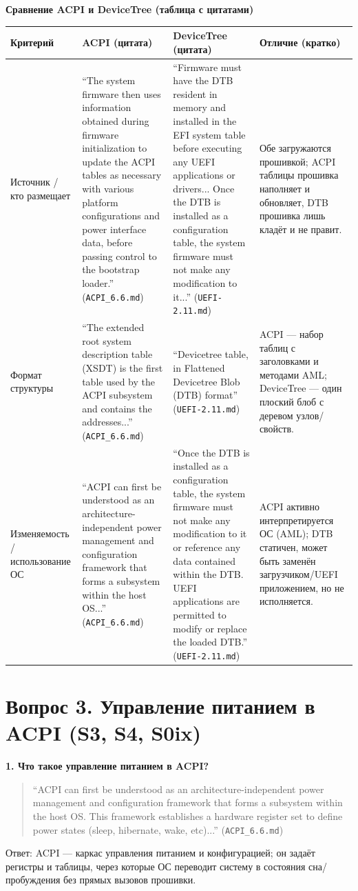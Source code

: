\documentclass[a4paper,12pt]{article}
\begin{document}
\noindent\textbf{Сравнение ACPI и DeviceTree (таблица с цитатами)}\\[4pt]
\begin{tabular}{|p{2.6cm}|p{4.6cm}|p{4.6cm}|p{3cm}|}
\hline
Критерий & ACPI (цитата) & DeviceTree (цитата) & Отличие (кратко) \\
\hline
Источник / кто размещает & ``The system firmware then uses information obtained during firmware initialization to update the ACPI tables as necessary with various platform configurations and power interface data, before passing control to the bootstrap loader.'' (\texttt{ACPI\_6.6.md}) & ``Firmware must have the DTB resident in memory and installed in the EFI system table before executing any UEFI applications or drivers... Once the DTB is installed as a configuration table, the system firmware must not make any modification to it...'' (\texttt{UEFI-2.11.md}) & Обе загружаются прошивкой; ACPI таблицы прошивка наполняет и обновляет, DTB прошивка лишь кладёт и не правит. \\
\hline
Формат структуры & ``The extended root system description table (XSDT) is the first table used by the ACPI subsystem and contains the addresses...'' (\texttt{ACPI\_6.6.md}) & ``Devicetree table, in Flattened Devicetree Blob (DTB) format'' (\texttt{UEFI-2.11.md}) & ACPI — набор таблиц с заголовками и методами AML; DeviceTree — один плоский блоб с деревом узлов/свойств. \\
\hline
Изменяемость / использование ОС & ``ACPI can first be understood as an architecture-independent power management and configuration framework that forms a subsystem within the host OS...'' (\texttt{ACPI\_6.6.md}) & ``Once the DTB is installed as a configuration table, the system firmware must not make any modification to it or reference any data contained within the DTB. UEFI applications are permitted to modify or replace the loaded DTB.'' (\texttt{UEFI-2.11.md}) & ACPI активно интерпретируется ОС (AML); DTB статичен, может быть заменён загрузчиком/UEFI приложением, но не исполняется. \\
\hline
\end{tabular}

\section*{Вопрос 3. Управление питанием в ACPI (S3, S4, S0ix)}
\textbf{1. Что такое управление питанием в ACPI?} 
\begin{quote}
``ACPI can first be understood as an architecture-independent power management and configuration framework that forms a subsystem within the host OS. This framework establishes a hardware register set to define power states (sleep, hibernate, wake, etc)...'' (\texttt{ACPI\_6.6.md})
\end{quote}
Ответ: ACPI — каркас управления питанием и конфигурацией; он задаёт регистры и таблицы, через которые ОС переводит систему в состояния сна/пробуждения без прямых вызовов прошивки.
\end{document}
